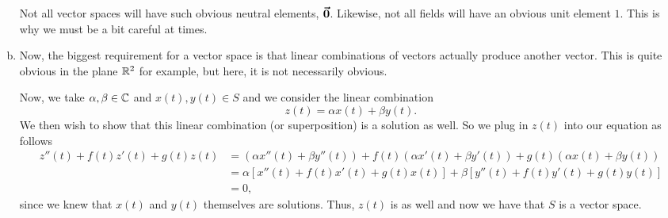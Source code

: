 \documentclass[12pt]{article} %
\begin{document}
\begin{solution}
\begin{enumerate}[(a)]
    \begin{remark} 
        Not all vector spaces will have such obvious neutral elements, $\boldsymbol{\vec{0}}$. Likewise, not all fields will have an obvious unit element $1$.  This is why we must be a bit careful at times.
    \end{remark}
    \item Now, the biggest requirement for a vector space is that linear combinations of vectors actually produce another vector. This is quite obvious in the plane $\mathbb{R}^2$ for example, but here, it is not necessarily obvious.  
    
    Now, we take $\alpha,\beta \in \mathbb{C}$ and $x(t),y(t)\in S$ and we consider the linear combination
    \[
    z(t) = \alpha x(t) + \beta y(t).
    \]
    We then wish to show that this linear combination (or superposition) is a solution as well. So we plug in $z(t)$ into our equation as follows
    \begin{align*}
        z''(t)+f(t)z'(t)+g(t)z(t)&= (\alpha x''(t) + \beta y''(t))+f(t)(\alpha x'(t) + \beta y'(t))+g(t)(\alpha x(t)+\beta y(t))\\
        &= \alpha \left[x''(t)+f(t)x'(t)+g(t)x(t)\right] + \beta \left[ y''(t)+f(t)y'(t)+g(t)y(t)\right]\\
        &=0,
    \end{align*}
    since we knew that $x(t)$ and $y(t)$ themselves are solutions. Thus, $z(t)$ is as well and now we have that $S$ is a vector space.
\end{enumerate}
\end{solution}
\end{document}

